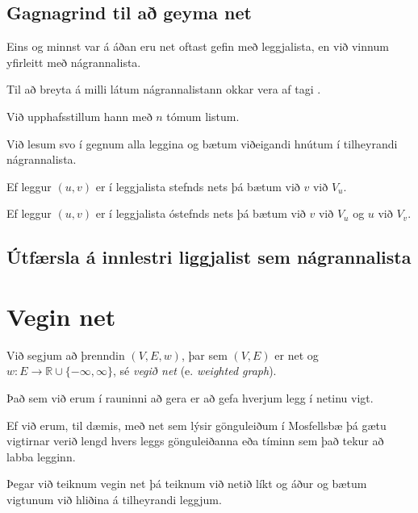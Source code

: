 \subsection{Gagnagrind til að geyma net}
{
    {
        \item<1-> Eins og minnst var á áðan eru net oftast gefin með leggjalista, en við vinnum yfirleitt með nágrannalista.
        \item<2-> Til að breyta á milli látum nágrannalistann okkar vera af tagi .
        \item<3-> Við upphafsstillum hann með $n$ tómum listum.
        \item<4-> Við lesum svo í gegnum alla leggina og bætum viðeigandi hnútum í tilheyrandi nágrannalista.
        \item<5-> Ef leggur $(u, v)$ er í leggjalista stefnds nets þá bætum við $v$ við $V_u$.
        \item<6-> Ef leggur $(u, v)$ er í leggjalista óstefnds nets þá bætum við $v$ við $V_u$ og $u$ við $V_v$.
    }
}

\subsection{Útfærsla á innlestri liggjalist sem nágrannalista}
{
}

\section{Vegin net}
{
    {
        \item<1-> Við segjum að þrenndin $(V, E, w)$, þar sem $(V, E)$ er net og $w \colon E \rightarrow \mathbb{R} \cup \{-\infty, \infty\}$, sé
            \emph{vegið net} (e. \emph{weighted graph}).
        \item<2-> Það sem við erum í rauninni að gera er að gefa hverjum legg í netinu vigt.
        \item<3-> Ef við erum, til dæmis, með net sem lýsir gönguleiðum í Mosfellsbæ þá gætu vigtirnar verið lengd hvers leggs gönguleiðanna
            eða tíminn sem það tekur að labba legginn.
        \item<4-> Þegar við teiknum vegin net þá teiknum við netið líkt og áður og bætum vigtunum við hliðina á tilheyrandi leggjum.
    }
}


